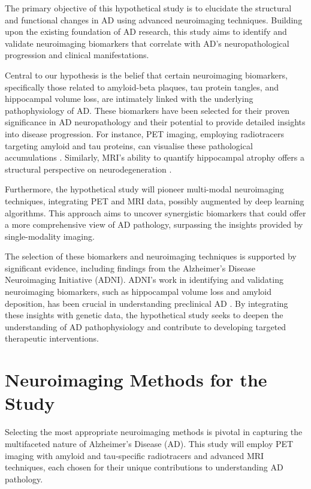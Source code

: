 \documentclass[10pt]{article}
\begin{document}
\begin{sloppypar}
  The primary objective of this hypothetical study is to elucidate the structural and functional changes in AD using advanced neuroimaging techniques. Building upon the existing foundation of AD research, this study aims to identify and validate neuroimaging biomarkers that correlate with AD’s neuropathological progression and clinical manifestations.

  Central to our hypothesis is the belief that certain neuroimaging biomarkers, specifically those related to amyloid-beta plaques, tau protein tangles, and hippocampal volume loss, are intimately linked with the underlying pathophysiology of AD. These biomarkers have been selected for their proven significance in AD neuropathology and their potential to provide detailed insights into disease progression. For instance, PET imaging, employing radiotracers targeting amyloid and tau proteins, can visualise these pathological accumulations \citep{bao_pet_2021}. Similarly, MRI’s ability to quantify hippocampal atrophy offers a structural perspective on neurodegeneration \citep{besson_cognitive_2015}.

  Furthermore, the hypothetical study will pioneer multi-modal neuroimaging techniques, integrating PET and MRI data, possibly augmented by deep learning algorithms. This approach aims to uncover synergistic biomarkers that could offer a more comprehensive view of AD pathology, surpassing the insights provided by single-modality imaging.

  The selection of these biomarkers and neuroimaging techniques is supported by significant evidence, including findings from the Alzheimer’s Disease Neuroimaging Initiative (ADNI). ADNI’s work in identifying and validating neuroimaging biomarkers, such as hippocampal volume loss and amyloid deposition, has been crucial in understanding preclinical AD \citep{saykin_genetic_2015}. By integrating these insights with genetic data, the hypothetical study seeks to deepen the understanding of AD pathophysiology and contribute to developing targeted therapeutic interventions.

  \section{Neuroimaging Methods for the Study}
  \label{sec:neuroimaging-methods}

  Selecting the most appropriate neuroimaging methods is pivotal in capturing the multifaceted nature of Alzheimer’s Disease (AD). This study will employ PET imaging with amyloid and tau-specific radiotracers and advanced MRI techniques, each chosen for their unique contributions to understanding AD pathology.


\end{sloppypar}
\end{document}
